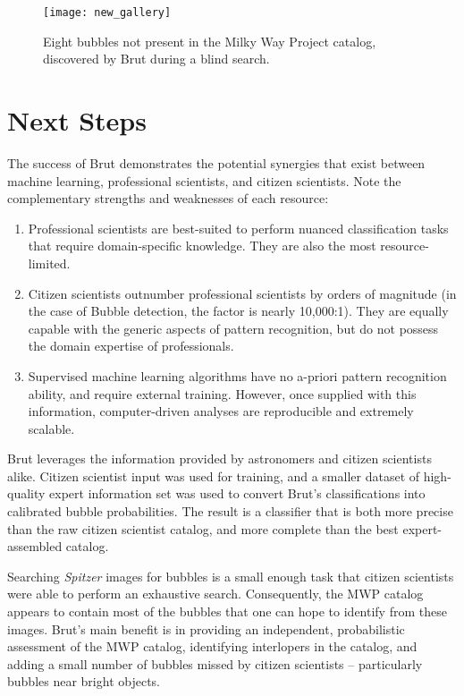\documentclass[preprint]{aastex}
\begin{document}
\begin{figure*}
\texttt{[image: new\_gallery]}
\caption{Eight bubbles not present in the Milky Way Project catalog, discovered by Brut during a blind search.}
\label{fig:new_gallery}
\end{figure*}

\section{Next Steps}
\label{sec:next_steps}
The success of Brut demonstrates the potential synergies that exist between machine learning, professional scientists, and citizen scientists. Note the complementary strengths and weaknesses of each resource:

\begin{enumerate}
\item Professional scientists are best-suited to perform nuanced classification tasks that require domain-specific knowledge. They are also the most resource-limited. 
\item Citizen scientists outnumber professional scientists by orders of magnitude (in the case of Bubble detection, the factor is nearly 10,000:1). They are equally capable with the generic aspects of pattern recognition, but do not possess the domain expertise of professionals.
\item Supervised machine learning algorithms have no a-priori pattern recognition ability, and require external training. However, once supplied with this information, computer-driven analyses are reproducible and extremely scalable.
\end{enumerate}

Brut leverages the information provided by astronomers and citizen scientists alike. Citizen scientist input was used for training, and a smaller dataset of high-quality expert information set was used to convert Brut's classifications into calibrated bubble probabilities. The result is a classifier that is both more precise than the raw citizen scientist catalog, and more complete than the best expert-assembled catalog.

Searching \emph{Spitzer} images for bubbles is a small enough task that citizen scientists were able to perform an exhaustive search. Consequently, the MWP catalog appears to contain most of the bubbles that one can hope to identify from these images. Brut's main benefit is in providing an independent, probabilistic assessment of the MWP catalog, identifying interlopers in the catalog, and adding a small number of bubbles missed by citizen scientists -- particularly bubbles near bright objects.
\end{document}
